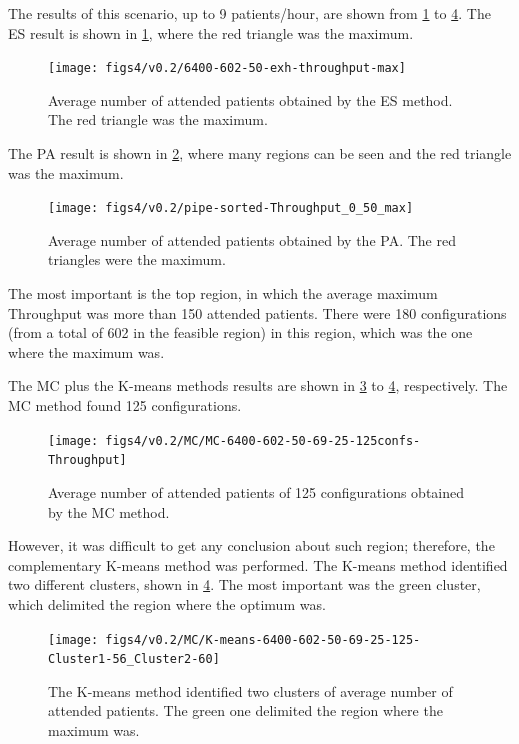 The results of this scenario, up to 9 patients/hour, are shown from
\ref{subfig:es8-2} to \ref{subfig:km8-2}. The ES result is shown
in \ref{subfig:es8-2}, where the red triangle was the maximum. 
\begin{figure}[H]
\centering{}\texttt{[image: figs4/v0.2/6400-602-50-exh-throughput-max]}\caption{Average number of attended patients obtained by the ES method. The
red triangle was the maximum.\label{subfig:es8-2}}
\end{figure}


The PA result is shown in \ref{subfig:pipe8-2}, where many regions
can be seen and the red triangle was the maximum. 
\begin{figure}[H]
\centering{}\texttt{[image: figs4/v0.2/pipe-sorted-Throughput\_0\_50\_max]}\caption{Average number of attended patients obtained by the PA. The red triangles
were the maximum.\label{subfig:pipe8-2}}
\end{figure}
 The most important is the top region, in which the average maximum
Throughput was more than 150 attended patients. There were 180 configurations
(from a total of 602 in the feasible region) in this region, which
was the one where the maximum was.

The MC plus the K-means methods results are shown in \ref{subfig:mc8-2}
to \ref{subfig:km8-2}, respectively. The MC method found 125 configurations.
\begin{figure}[H]
\centering{}\texttt{[image: figs4/v0.2/MC/MC-6400-602-50-69-25-125confs-Throughput]}\caption{Average number of attended patients of 125 configurations obtained
by the MC method. \label{subfig:mc8-2}}
\end{figure}
 However, it was difficult to get any conclusion about such region;
therefore, the complementary K-means method was performed. The K-means
method identified two different clusters, shown in \ref{subfig:km8-2}.
The most important was the green cluster, which delimited the region
where the optimum was.
\begin{figure}[H]
\begin{centering}
\texttt{[image: figs4/v0.2/MC/K-means-6400-602-50-69-25-125-Cluster1-56\_Cluster2-60]}
\par\end{centering}

\caption{The K-means method identified two clusters of average number of attended
patients. The green one delimited the region where the maximum was.\label{subfig:km8-2}}
\end{figure}


